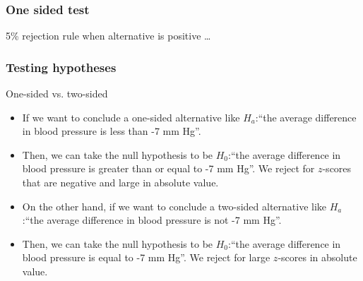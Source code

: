 \documentclass[handout]{beamer}
\begin{document}
   \begin{frame}
   \frametitle{One sided test}
   \begin{center}
   \end{center}
   {\color{blue} 5\% rejection rule} when alternative is positive \dots
   \end{frame}


   \begin{frame} \frametitle{Testing hypotheses}

   \begin{block}
   {One-sided vs. two-sided}
   \begin{itemize}

   \item If we want to conclude a one-sided alternative like
     $H_a$:``the average difference in blood pressure is less than -7 mm Hg''.
   \item Then, we can take the null hypothesis to be
   $H_0$:``the average difference in blood pressure is greater than or equal to -7 mm Hg''.
   We reject for $z$-scores that are negative and large
   in absolute value.

   \item On the other hand, if we want to conclude a two-sided
   alternative like $H_a$:``the average difference in blood pressure is
    not -7 mm Hg''.

   \item Then, we can take the null hypothesis to be
   $H_0$:``the average difference
   in blood pressure is equal to -7 mm Hg''. We reject for large $z$-scores
   in absolute value.


   \end{itemize}
   \end{block}
   \end{frame}

\end{document}
